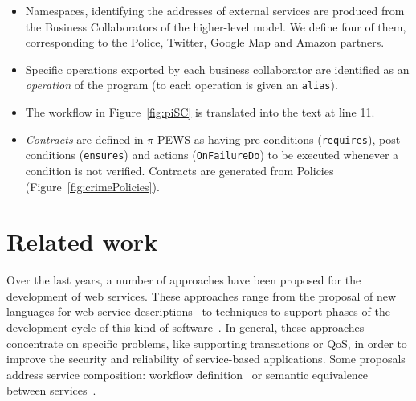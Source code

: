 \documentclass{llncs}
\theoremstyle{plain}
\theoremstyle{plain}
\theoremstyle{plain}
\begin{document}
\begin{itemize}
\item
Namespaces, identifying the addresses of external services are produced from the Business Collaborators of the higher-level model. 
We define four of them, corresponding to the Police, Twitter, Google Map and Amazon partners.
\item
Specific operations exported by each business collaborator are identified as an \textit{operation} of the program (to each operation is given an \texttt{alias}).
\item
The workflow in Figure~\ref{fig:piSC} is translated into the text at line 11.
\item
\textit{Contracts} are defined in $\pi$-PEWS as having pre-conditions (\texttt{requires}), post-conditions (\texttt{ensures}) and actions (\texttt{OnFailureDo}) to be executed whenever a condition is not verified. 
Contracts are generated from Policies (Figure~\ref{fig:crimePolicies}).
\end{itemize}



\section{Related work}
\label{sec:related}
Over the last years, a number of approaches have been proposed for the
development of web services. 
These approaches range from the proposal of new 
languages for web service descriptions~\cite{bpel03,SBS04} 
to techniques to support phases of the development cycle of this kind of
software~\cite{lipari2007}. 
In general, these approaches concentrate on specific problems, like supporting transactions or
QoS, in order to improve the security and reliability of service-based
applications. 
Some proposals address service composition: workflow
definition~\cite{AalstHKB03,MuP06} or semantic equivalence between
services~\cite{BHM06}. 
\end{document}
